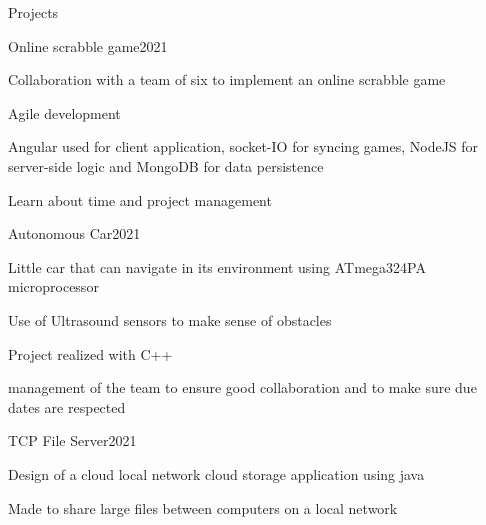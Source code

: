 \documentclass{resume} %
\begin{document}
	\begin{rSection}{Projects}
		\begin{rSubsection}{Online scrabble game}{2021}{}{}
			\item Collaboration with a team of six to implement an online scrabble game
			\item Agile development
			\item Angular used for client application, socket-IO for syncing games, NodeJS for server-side logic and MongoDB for data persistence
			\item Learn about time and project management
		 \end{rSubsection}
		\begin{rSubsection}{Autonomous Car}{2021}{}{}
			\item Little car that can navigate in its environment using ATmega324PA microprocessor
			\item Use of Ultrasound sensors to make sense of obstacles
			\item Project realized with C++
			\item management of the team to ensure good collaboration and to make sure due dates are respected
		 \end{rSubsection}

		 \begin{rSubsection}{TCP File Server}{2021}{}{}
			\item Design of a cloud local network cloud storage application using java
			\item Made to share large files between computers on a local network
		\end{rSubsection}


\end{rSection}
\end{document}
